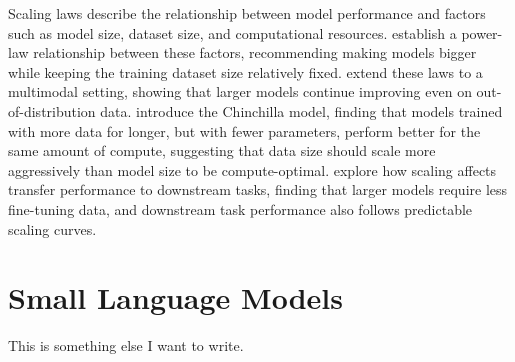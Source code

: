 Scaling laws describe the relationship between model performance and factors such as model size, dataset size, and computational resources. \citet{kaplan2020scaling} establish a power-law relationship between these factors, recommending making models bigger while keeping the training dataset size relatively fixed. \citet{henighan2020scaling} extend these laws to a multimodal setting, showing that larger models continue improving even on out-of-distribution data. \citet{hoffman2022chinchilla} introduce the Chinchilla model, finding that models trained with more data for longer, but with fewer parameters, perform better for the same amount of compute, suggesting that data size should scale more aggressively than model size to be compute-optimal. \citet{hernandez2021scaling} explore how scaling affects transfer performance to downstream tasks, finding that larger models require less fine-tuning data, and downstream task performance also follows predictable scaling curves.

\section{Small Language Models}

This is something else I want to write.






